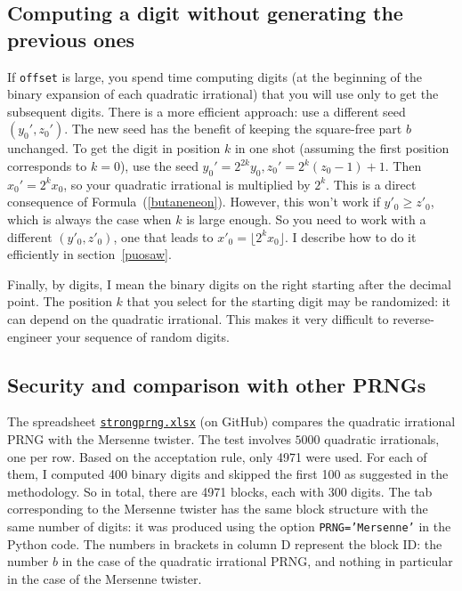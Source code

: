 \documentclass[oneside,10pt]{book}
\begin{document}
\subsection{Computing a digit without generating the previous ones}\label{imprsqrt2mnb}

If \texttt{offset} is large, you spend time computing digits (at the beginning of the binary expansion of each quadratic irrational) that you will use only   to get the subsequent digits. 
 There is a more efficient approach: use a different seed $(y_0', z_0')$. The new seed has the benefit of keeping
 the square-free part $b$ unchanged. To get the digit in position $k$ in one shot (assuming the first position corresponds to $k=0$), use the 
 seed $y_0'=2^{2k} y_0, z_0'=2^k(z_0-1) + 1$. Then $x_0' = 2^k x_0$, so your quadratic irrational is multiplied by $2^k$. This is a direct consequence
of Formula~(\ref{butaneneon}). However, this won't work if $y'_0 \geq z'_0$, which is always the case when $k$ is large enough. 
So you need to work with a different $(y'_0, z'_0)$, one that leads to $x'_0 = \lfloor 2^k x_0 \rfloor$. I describe how to do it efficiently
in section~\ref{puosaw}. 

Finally, by digits, I mean the binary digits on the right starting after the decimal point. The position $k$ that you select for the starting digit may be randomized: it can depend on the quadratic irrational. This makes it
 very difficult to reverse-engineer your sequence of random digits.

\subsection{Security and comparison with other PRNGs}

The spreadsheet \href{https://github.com/VincentGranville/Experimental-Math-Number-Theory/blob/main/Source-Code/strongprng.xlsx}{\texttt{strongprng.xlsx}} (on GitHub) compares the quadratic irrational PRNG with the 
Mersenne twister. The test involves $\num{5000}$ quadratic irrationals, one per row. Based on the acceptation rule, only 4971 were used. For each of them, I computed 400 binary digits and skipped the first 100 as suggested in the
 methodology. So in total, there are 4971 blocks, each with 300 digits. The tab corresponding to the Mersenne twister has the same block structure with the same number of digits: it was produced using the option \texttt{PRNG='Mersenne'} in the Python code. The numbers in brackets in column D represent the block ID: the number $b$ in the case of the quadratic irrational PRNG, and nothing in particular in the case of the Mersenne twister.
\end{document}
